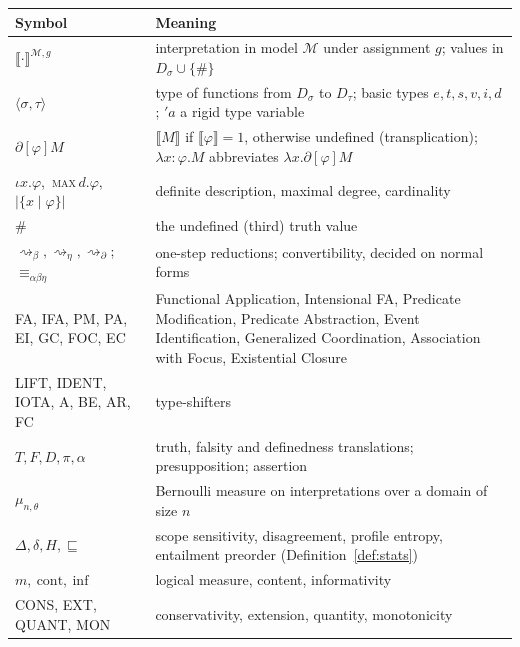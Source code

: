 \documentclass[11pt,a4paper]{article}
\newcommand{\den}[1]{\llbracket #1\rrbracket}
\newcommand{\ty}[1]{\langle #1\rangle}
\theoremstyle{definition}
\begin{document}
\begin{table}[h]\centering\small
\renewcommand{\arraystretch}{1.2}
\begin{tabularx}{\textwidth}{@{}lL@{}}
\toprule
Symbol & Meaning\\
\midrule
$\den{\cdot}^{\mathcal{M},g}$ & interpretation in model $\mathcal{M}$ under assignment $g$; values in $D_\sigma\cup\{\#\}$\\
$\ty{\sigma,\tau}$ & type of functions from $D_\sigma$ to $D_\tau$; basic types $e,t,s,v,i,d$; $'a$ a rigid type variable\\
$\partial[\varphi]M$ & $\den{M}$ if $\den{\varphi}=1$, otherwise undefined (transplication); $\lambda x:\varphi.M$ abbreviates $\lambda x.\partial[\varphi]M$\\
$\iota x.\varphi$,\ \textsc{max}\,$d.\varphi$,\ $|\{x\mid\varphi\}|$ & definite description, maximal degree, cardinality\\
$\#$ & the undefined (third) truth value\\
$\rightsquigarrow_\beta,\rightsquigarrow_\eta,\rightsquigarrow_\partial$;\ $\equiv_{\alpha\beta\eta}$ & one-step reductions; convertibility, decided on normal forms\\
FA, IFA, PM, PA, EI, GC, FOC, EC & Functional Application, Intensional FA, Predicate Modification, Predicate Abstraction, Event Identification, Generalized Coordination, Association with Focus, Existential Closure\\
\textsf{LIFT}, \textsf{IDENT}, \textsf{IOTA}, \textsf{A}, \textsf{BE}, AR, FC & type-shifters \citep{partee1987,hendriks1993,geach1972}\\
$T,F,D,\pi,\alpha$ & truth, falsity and definedness translations; presupposition; assertion\\
$\mu_{n,\theta}$ & Bernoulli measure on interpretations over a domain of size $n$\\
$\Delta,\delta,H,\sqsubseteq$ & scope sensitivity, disagreement, profile entropy, entailment preorder (Definition~\ref{def:stats})\\
$m,\ \mathrm{cont},\ \mathrm{inf}$ & logical measure, content, informativity \citep{carnapbarhillel1952}\\
CONS, EXT, QUANT, MON & conservativity, extension, quantity, monotonicity \citep{barwisecooper1981,vanbenthem1986}\\
\bottomrule
\end{tabularx}
\end{table}
\end{document}
